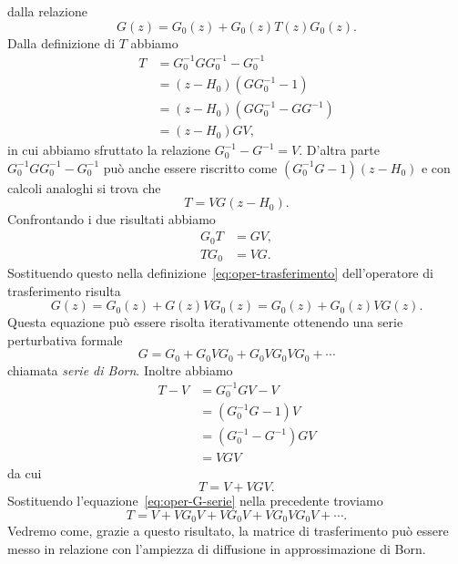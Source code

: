 \documentclass[a4paper,fleqn,twoside,12pt]{article}
\begin{document}
dalla relazione
\begin{equation}
  \label{eq:oper-trasferimento}
  G(z) = G_{0}(z) + G_{0}(z) T(z) G_{0}(z).
\end{equation}
Dalla definizione di $T$ abbiamo
\begin{equation}
  \begin{split}
    T &= G_{0}^{-1} G G_{0}^{-1} - G_{0}^{-1} \\
    &= (z - H_{0})(GG_{0}^{-1} - 1) \\
    &= (z - H_{0})(GG_{0}^{-1} - GG^{-1}) \\
    &= (z - H_{0})GV,
  \end{split}
\end{equation}
in cui abbiamo sfruttato la relazione $G_{0}^{-1} - G^{-1} = V$.  D'altra parte
$G_{0}^{-1} G G_{0}^{-1} - G_{0}^{-1}$ può anche essere riscritto come
$(G_{0}^{-1}G - 1)(z - H_{0})$ e con calcoli analoghi si trova che
\begin{equation}
  T = VG(z - H_{0}).
\end{equation}
Confrontando i due risultati abbiamo
\begin{subequations}
  \begin{align}
    G_{0} T &= GV, \\
    T G_{0} &= VG.
  \end{align}
\end{subequations}
Sostituendo questo nella definizione~\eqref{eq:oper-trasferimento}
dell'operatore di trasferimento risulta
\begin{equation}
  \label{eq:baz}
  G(z) = G_{0}(z) + G(z)VG_{0}(z) = G_{0}(z) + G_{0}(z)VG(z).
\end{equation}
Questa equazione può essere risolta iterativamente ottenendo una serie
perturbativa formale
\begin{equation}
  \label{eq:oper-G-serie}
  G = G_{0} + G_{0}VG_{0} + G_{0}VG_{0}VG_{0} + \cdots
\end{equation}
chiamata \emph{serie di Born}.  Inoltre abbiamo
\begin{equation}
  \begin{split}
    T - V &= G_{0}^{-1} G V -V \\
    &= (G_{0}^{-1}G - 1)V \\
    &= (G_{0}^{-1} - G^{-1})GV \\
    &= VGV
  \end{split}
\end{equation}
da cui
\begin{equation}
  T = V + VGV.
\end{equation}
Sostituendo l'equazione~\eqref{eq:oper-G-serie} nella precedente troviamo
\begin{equation}
  \label{eq:oper-T-serie}
  T = V + VG_{0}V + VG_{0}V + VG_{0}VG_{0}V + \cdots.
\end{equation}
Vedremo come, grazie a questo risultato, la matrice di trasferimento può essere
messo in relazione con l'ampiezza di diffusione in approssimazione di
Born.
\end{document}
